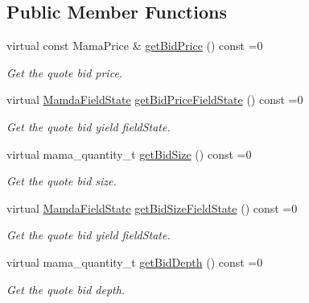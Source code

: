 \subsection*{Public Member Functions}
\begin{CompactItemize}
\item 
virtual const Mama\-Price \& \hyperlink{classWombat_1_1MamdaQuoteOutOfSequence_af6014e4342076750ed12bcb4cefe62d}{get\-Bid\-Price} () const =0
\begin{CompactList}\small\item\em Get the quote bid price. \item\end{CompactList}\item 
virtual \hyperlink{namespaceWombat_93aac974f2ab713554fd12a1fa3b7d2a}{Mamda\-Field\-State} \hyperlink{classWombat_1_1MamdaQuoteOutOfSequence_0c70e9a4b5c452a8f22d79f3faf67cf7}{get\-Bid\-Price\-Field\-State} () const =0
\begin{CompactList}\small\item\em Get the quote bid yield field\-State. \item\end{CompactList}\item 
virtual mama\_\-quantity\_\-t \hyperlink{classWombat_1_1MamdaQuoteOutOfSequence_75acf46a72e24b7d535bdcc4d495566a}{get\-Bid\-Size} () const =0
\begin{CompactList}\small\item\em Get the quote bid size. \item\end{CompactList}\item 
virtual \hyperlink{namespaceWombat_93aac974f2ab713554fd12a1fa3b7d2a}{Mamda\-Field\-State} \hyperlink{classWombat_1_1MamdaQuoteOutOfSequence_349931c22f5522b07b991efc90c06140}{get\-Bid\-Size\-Field\-State} () const =0
\begin{CompactList}\small\item\em Get the quote bid yield field\-State. \item\end{CompactList}\item 
virtual mama\_\-quantity\_\-t \hyperlink{classWombat_1_1MamdaQuoteOutOfSequence_3f27ce9e3648fbacc6cfdd4cb19c4f2c}{get\-Bid\-Depth} () const =0
\begin{CompactList}\small\item\em Get the quote bid depth. \item\end{CompactList}\item 

\end{CompactItemize}
